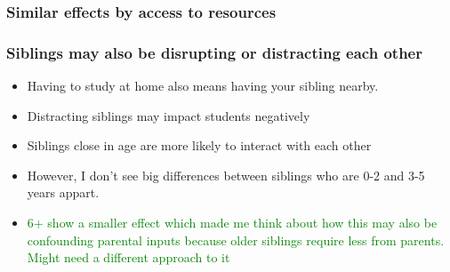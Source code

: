 \documentclass{beamer}
\begin{document}
\begin{frame}
    \label{frame:resources}
    \frametitle{Similar effects by access to resources}
        {
    }

    \begin{flushleft}
        \hyperlink{frame:resources_siblings}{}
    \end{flushleft}    

\end{frame}






\begin{frame}
    \label{frame:siblingdisruption_intro}
    \frametitle{Siblings may also be disrupting or distracting each other}
       \begin{itemize}
           \item Having to study at home also means having your sibling nearby. 
           \item Distracting siblings may impact students negatively
           \item Siblings close in age are more likely to interact with each other
           \item However, I don't see big differences between siblings who are 0-2 and 3-5 years appart. 
           \item \textcolor{green}{6+ show a smaller effect which made me think about how this may also be confounding parental inputs because older siblings require less from parents. Might need a different approach to it}
       \end{itemize}
\end{frame}
\end{document}
